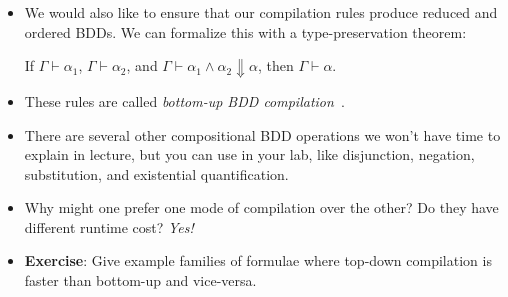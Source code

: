 \documentclass{tufte-handout}
\begin{document}
\begin{itemize}
\begin{proof}
  where $(\star)$ follows from a simple lemma that $\otimes$ distributes over intersection 
  and $(\dagger)$ follows from distributivity properties of union and intersection, 
  in particular the fact that for any sets $A,B,C,D$ it is the case that $(A \cup B) \cap (C \cup D) = 
  (A \cap C) \cup (B \cap D)$.
  
  \end{proof}

  \item We would also like to ensure that our compilation rules produce reduced and ordered 
  BDDs. We can formalize this with a type-preservation theorem:
  \begin{theorem}
    If $\Gamma \vdash \alpha_1$, $\Gamma \vdash \alpha_2$, and $\Gamma \vdash \alpha_1 \land \alpha_2 \Downarrow \alpha$, 
    then $\Gamma \vdash \alpha$.
  \end{theorem}

  \item These rules are called \emph{bottom-up BDD compilation}~\citep{darwiche2002knowledge,oztok2015top}. 
  \item There are several other compositional BDD operations we won't have time
  to explain in lecture, but you can use in your lab, like disjunction, negation, substitution, 
  and existential quantification.
  \item Why might one prefer one mode of compilation over the other? Do they
  have different runtime cost? \emph{Yes!}
  \item \textbf{Exercise}: Give example families of formulae where
  top-down compilation is faster than bottom-up and vice-versa.
\end{itemize}
\end{document}
